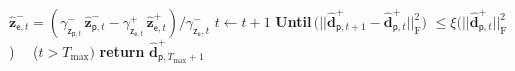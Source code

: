 \begin{algorithm}[h!]
\begin{algorithmic}[1]
\StateGreen $\mathbf{\widehat{z}}^-_{\mathsf{e}, t}=\left(\gamma_{\bm{\mathsf{z}}_{\mathsf{p},t}}^-\, \widehat{\bm{z}}_{\mathsf{p}, t}^--\gamma_{\bm{\mathsf{z}}_{\mathsf{e}, t}}^+\, \mathbf{\widehat{z}}^+_{\mathsf{e},t}\right) / \gamma_{\bm{\mathsf{z}}_{\mathsf{e}},t}^-$
\StateBlack $t \gets t + 1$\vspace{0.1cm}
\State \textbf{Until}\,$\Big(\big|\!\big|\boldsymbol{\widehat{d}}_{ \mathsf{p},t+1}^{+}-\boldsymbol{\widehat{d}}_{ \mathsf{p},t}^{+}\big|\!\big|^2_{\textrm{F}}\Big)$ $\leq\xi\Big( \big|\!\big|\boldsymbol{\widehat{d}}_{ \mathsf{p},t}^{+}\big|\!\big|^2_{\textrm{F}}$\Big)~~ \Big($t>T_\textrm{max}\Big)$\vspace{0.1cm}
\State \textbf{return} $\widehat{\bm{d}}_{\mathsf{p}, T_{\textrm{max}}+1}^+$
\end{algorithmic}
\end{algorithm}
